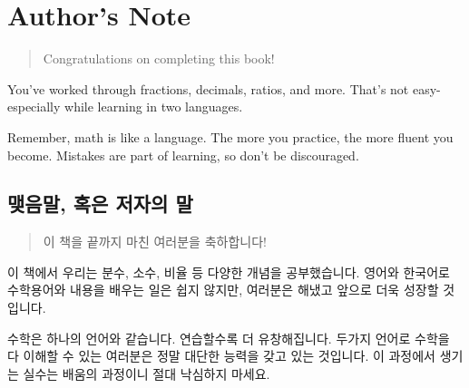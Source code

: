 \newpage
\section*{Author's Note}
\blockquote{Congratulations on completing this book!}
You've worked through fractions, decimals, ratios, and more. 
That's not easy-especially while learning in two languages.

Remember, math is like a language. The more you practice, the 
more fluent you become. Mistakes are part of learning, so 
don't be discouraged.

\subsection*{맺음말, 혹은 저자의 말}
\blockquote{이 책을 끝까지 마친 여러분을 축하합니다!}
이 책에서 우리는 분수, 소수, 비율 등 다양한 개념을 공부했습니다. 
영어와 한국어로 수학용어와 내용을 배우는 일은 쉽지 않지만, 여러분은 
해냈고 앞으로 더욱 성장할 것입니다.

수학은 하나의 언어와 같습니다. 연습할수록 더 유창해집니다. 두가지 
언어로 수학을 다 이해할 수 있는 여러분은 정말 대단한 능력을 갖고 
있는 것입니다. 이 과정에서 생기는 실수는 배움의 과정이니 절대 
낙심하지 마세요.
